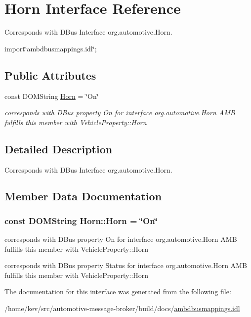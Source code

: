 \hypertarget{interfaceHorn}{\section{Horn Interface Reference}
\label{interfaceHorn}
}


Corresponds with D\+Bus Interface org.\+automotive.\+Horn.  




{\ttfamily import\char`\"{}ambdbusmappings.\+idl\char`\"{};}

\subsection*{Public Attributes}
\begin{DoxyCompactItemize}
\item 
const D\+O\+M\+String \hyperlink{interfaceHorn_abc6176894cc42e5e6b533fc641c18fb5}{Horn} = \char`\"{}On\char`\"{}
\begin{DoxyCompactList}\small\item\em corresponds with D\+Bus property On for interface org.\+automotive.\+Horn A\+M\+B fulfills this member with Vehicle\+Property\+::\+Horn \end{DoxyCompactList}\end{DoxyCompactItemize}


\subsection{Detailed Description}
Corresponds with D\+Bus Interface org.\+automotive.\+Horn. 

\subsection{Member Data Documentation}
\hypertarget{interfaceHorn_abc6176894cc42e5e6b533fc641c18fb5}{
\subsubsection[{Horn}]{\setlength{\rightskip}{0pt plus 5cm}const D\+O\+M\+String Horn\+::\+Horn = \char`\"{}On\char`\"{}}}\label{interfaceHorn_abc6176894cc42e5e6b533fc641c18fb5}


corresponds with D\+Bus property On for interface org.\+automotive.\+Horn A\+M\+B fulfills this member with Vehicle\+Property\+::\+Horn 

corresponds with D\+Bus property Status for interface org.\+automotive.\+Horn A\+M\+B fulfills this member with Vehicle\+Property\+::\+Horn 

The documentation for this interface was generated from the following file\+:\begin{DoxyCompactItemize}
\item 
/home/kev/src/automotive-\/message-\/broker/build/docs/\hyperlink{ambdbusmappings_8idl}{ambdbusmappings.\+idl}\end{DoxyCompactItemize}
